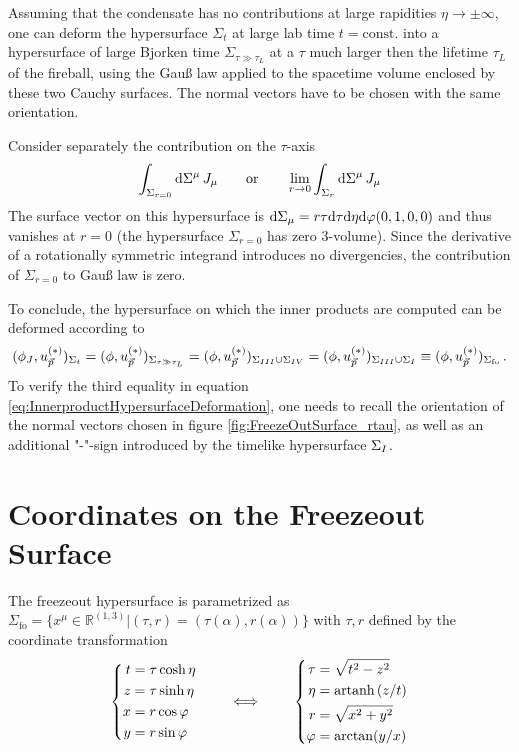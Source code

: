 Assuming that the condensate has no contributions at large rapidities $\eta\to\pm\infty$, one can deform the hypersurface $\Sigma_t$ at large lab time $t=\text{const.}$ into a hypersurface of large Bjorken time $\Sigma_{\tau\gg\tau_L}$ at a $\tau$ much larger then the lifetime $\tau_L$ of the fireball, using the Gauß law applied to the spacetime volume enclosed by these two Cauchy surfaces. The normal vectors have to be chosen with the same orientation.

Consider separately the contribution on the $\tau$-axis
\begin{equation*}
    \int_{\Sigma_{r=0}}\text{d}\Sigma^\mu\,J_\mu\qquad\text{or}\qquad\lim_{r\to 0}\int_{\Sigma_{r}}\text{d}\Sigma^\mu\,J_\mu
\end{equation*}
The surface vector on this hypersurface is $\text{d}\Sigma_\mu=r\tau\text{d}\tau\text{d}\eta\text{d}\varphi(0,1,0,0)$ and thus vanishes at $r=0$ (the hypersurface $\Sigma_{r=0}$ has zero $3$-volume). Since the derivative of a rotationally symmetric integrand introduces no divergencies, the contribution of $\Sigma_{r=0}$ to Gauß law is zero.

To conclude, the hypersurface on which the inner products are computed can be deformed according to
\begin{equation}
    (\phi_J,u_{\vec{p}}^{(*)})_{\Sigma_t}=(\phi,u_{\vec{p}}^{(*)})_{\Sigma_{\tau\gg\tau_L}}=(\phi,u_{\vec{p}}^{(*)})_{\Sigma_{\rom{3}}\cup\Sigma_{\rom{4}}}=(\phi,u_{\vec{p}}^{(*)})_{\Sigma_{\rom{3}}\cup\Sigma_{\rom{1}}}\equiv(\phi,u_{\vec{p}}^{(*)})_{\Sigma_{\text{fo}}}\,.
    \label{eq:InnerproductHypersurfaceDeformation}
\end{equation}
To verify the third equality in equation \ref{eq:InnerproductHypersurfaceDeformation}, one needs to recall the orientation of the normal vectors chosen in figure \ref{fig:FreezeOutSurface_rtau}, as well as an additional "-"-sign introduced by the timelike hypersurface $\Sigma_{\rom{1}}$.

\section{Coordinates on the Freezeout Surface}

The freezeout hypersurface is parametrized as $\Sigma_{\text{fo}}=\{x^\mu\in\mathbb{R}^{(1,3)}\vert (\tau,r)=(\tau(\alpha),r(\alpha))\}$ with $\tau,r$ defined by the coordinate transformation
\begin{equation}
    \left\{\begin{split}
        t&=\tau\cosh\eta\\
        z&=\tau\sinh\eta\\
        x&=r\cos\varphi\\
        y&=r\sin\varphi
    \end{split}\right.
    \qquad\iff\qquad
    \left\{\begin{split}
        \tau&=\sqrt{t^2-z^2}\\
        \eta&={\text{artanh}\,}(z/t)\\
        r&=\sqrt{x^2+y^2}\\
        \varphi&=\arctan(y/x)
    \end{split}\right.
\end{equation}

